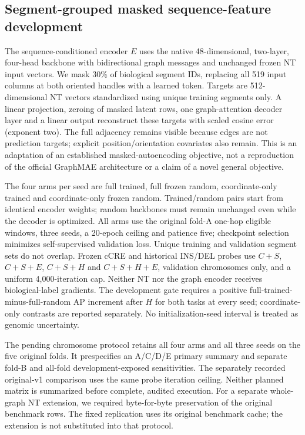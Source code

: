 \subsection{Segment-grouped masked sequence-feature development}

The sequence-conditioned encoder $E$ uses the native 48-dimensional, two-layer, four-head backbone with bidirectional graph messages and unchanged frozen NT input vectors. We mask 30\% of biological segment IDs, replacing all 519 input columns at both oriented handles with a learned token. Targets are 512-dimensional NT vectors standardized using unique training segments only. A linear projection, zeroing of masked latent rows, one graph-attention decoder layer and a linear output reconstruct these targets with scaled cosine error (exponent two). The full adjacency remains visible because edges are not prediction targets; explicit position/orientation covariates also remain. This is an adaptation of an established masked-autoencoding objective, not a reproduction of the official GraphMAE architecture or a claim of a novel general objective.

The four arms per seed are full trained, full frozen random, coordinate-only trained and coordinate-only frozen random. Trained/random pairs start from identical encoder weights; random backbones must remain unchanged even while the decoder is optimized. All arms use the original fold-A one-hop eligible windows, three seeds, a 20-epoch ceiling and patience five; checkpoint selection minimizes self-supervised validation loss. Unique training and validation segment sets do not overlap. Frozen cCRE and historical INS/DEL probes use $C+S$, $C+S+E$, $C+S+H$ and $C+S+H+E$, validation chromosomes only, and a uniform 4,000-iteration cap. Neither NT nor the graph encoder receives biological-label gradients. The development gate requires a positive full-trained-minus-full-random AP increment after $H$ for both tasks at every seed; coordinate-only contrasts are reported separately. No initialization-seed interval is treated as genomic uncertainty.

The pending chromosome protocol retains all four arms and all three seeds on the five original folds. It prespecifies an A/C/D/E primary summary and separate fold-B and all-fold development-exposed sensitivities. The separately recorded original-v1 comparison uses the same probe iteration ceiling. Neither planned matrix is summarized before complete, audited execution. For a separate whole-graph NT extension, we required byte-for-byte preservation of the original benchmark rows. The fixed replication uses its original benchmark cache; the extension is not substituted into that protocol.
